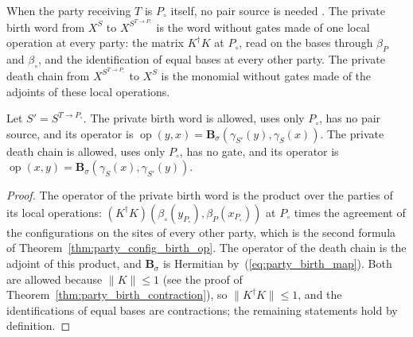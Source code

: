 \begin{definition}
    \label{def:party_private_birth}
    \leanok
    When the party receiving $T$ is $P_\circ$ itself, no pair source is needed
    \cite[proof of Lemma~6.5]{OpenAI2026PolynomialPEPS}. The private birth word from $X^S$ to
    $X^{S^{T\to P_\circ}}$ is the word without gates made of one local operation at every party:
    the matrix $K^\dagger K$ at $P_\circ$, read on the bases through $\beta_P$ and $\beta_\circ$,
    and the identification of equal bases at every other party. The private death chain from
    $X^{S^{T\to P_\circ}}$ to $X^S$ is the monomial without gates made of the adjoints of these
    local operations.
\end{definition}

\begin{theorem}
    \label{thm:party_private_birth}
    \leanok
    Let $S'=S^{T\to P_\circ}$. The private birth word is allowed, uses only $P_\circ$, has no
    pair source, and its operator is
    $\operatorname{op}(y,x)=\mathbf B_\sigma(\gamma_{S'}(y),\gamma_S(x))$. The private death chain
    is allowed, uses only $P_\circ$, has no gate, and its operator is
    $\operatorname{op}(x,y)=\mathbf B_\sigma(\gamma_S(x),\gamma_{S'}(y))$.
\end{theorem}
\begin{proof}\leanok
    The operator of the private birth word is the product over the parties of its local
    operations: $(K^\dagger K)(\beta_\circ(y_{P_\circ}),\beta_P(x_{P_\circ}))$ at $P_\circ$ times
    the agreement of the configurations on the sites of every other party, which is the second
    formula of Theorem~\ref{thm:party_config_birth_op}. The operator of the death chain is the
    adjoint of this product, and $\mathbf B_\sigma$ is Hermitian by~(\ref{eq:party_birth_map}).
    Both are allowed because $\lVert K\rVert\leq1$ (see the proof of
    Theorem~\ref{thm:party_birth_contraction}), so $\lVert K^\dagger K\rVert\leq1$, and the
    identifications of equal bases are contractions; the remaining statements hold by
    definition.
\end{proof}

